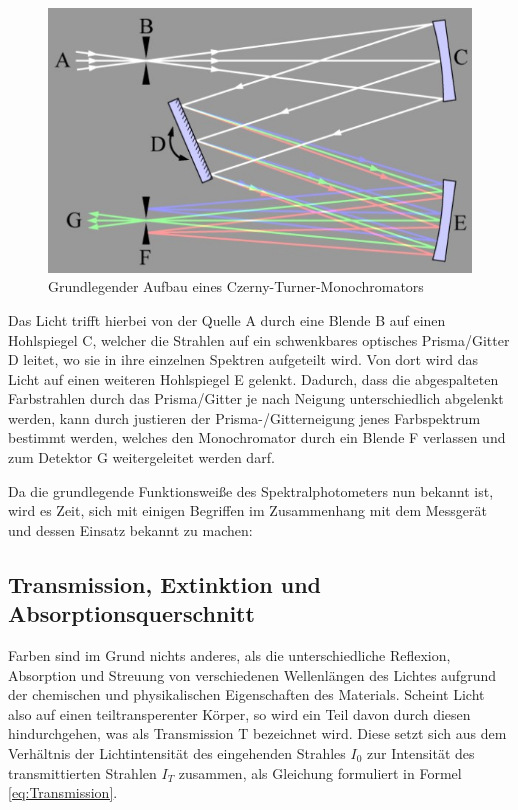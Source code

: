 \documentclass[12pt,a4paper,twoside]{article}
\begin{document}
\begin{figure}[H]
    \centering
    \includegraphics[width=0.6\linewidth]{nudes/MonochromatorAufbau.jpg}
    \caption{Grundlegender Aufbau eines Czerny-Turner-Monochromators}
    \label{fig:MonochromatorAufbau}
\end{figure}

\noindent
Das Licht trifft hierbei von der Quelle A durch eine Blende B auf einen Hohlspiegel C, welcher die Strahlen auf ein schwenkbares optisches Prisma/Gitter D leitet, wo sie in ihre einzelnen Spektren aufgeteilt wird.
Von dort wird das Licht auf einen weiteren Hohlspiegel E gelenkt. Dadurch, dass die abgespalteten Farbstrahlen durch das Prisma/Gitter je nach Neigung unterschiedlich abgelenkt werden, kann durch justieren der Prisma-/Gitterneigung jenes Farbspektrum bestimmt werden, welches den Monochromator durch ein Blende F verlassen und zum Detektor G weitergeleitet werden darf. \newline

\noindent
Da die grundlegende Funktionsweiße des Spektralphotometers nun bekannt ist, wird es Zeit, sich mit einigen Begriffen im Zusammenhang mit dem Messgerät und dessen Einsatz bekannt zu machen:


\subsection{Transmission, Extinktion und Absorptionsquerschnitt}

Farben sind im Grund nichts anderes, als die unterschiedliche Reflexion, Absorption und Streuung von verschiedenen Wellenlängen des Lichtes aufgrund der chemischen und physikalischen Eigenschaften des Materials. 
Scheint Licht also auf einen teiltransperenter Körper, so wird ein Teil davon durch diesen hindurchgehen, was als Transmission T bezeichnet wird. Diese setzt sich aus dem Verhältnis der Lichtintensität des eingehenden Strahles $I_{0}$ zur Intensität des transmittierten Strahlen $I_{T}$ zusammen, als Gleichung formuliert in Formel \ref{eq:Transmission}.
\end{document}
